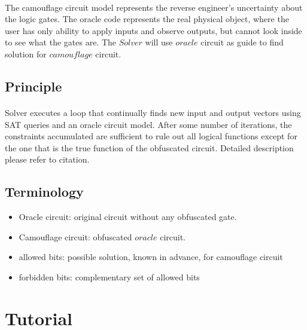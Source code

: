 \documentclass{article}
\begin{document}
	\paragraph{} The camouflage circuit model represents the reverse engineer's uncertainty about the logic gates. The oracle code represents the real physical object, where the user has only ability to apply inputs and observe outputs, but cannot look inside to see what the gates are. The $Solver$ will use $oracle$ circuit as guide to find solution for $camouflage$ circuit. 	
	\subsection{Principle} 
	\paragraph{}Solver executes a loop that continually finds new input and output vectors using SAT queries and an oracle circuit model. After some number of iterations, the constraints accumulated are sufficient to rule out all logical functions except for the one that is the true function of the obfuscated circuit. Detailed description please refer to citation. 
	\subsection{Terminology}
		\begin{itemize}
			\item Oracle circuit: original circuit without any obfuscated gate.
			\item Camouflage circuit: obfuscated $oracle$ circuit.
			\item allowed bits: possible solution, known in advance, for camouflage circuit
			\item forbidden bits: complementary set of allowed bits
		\end{itemize}

\section{Tutorial}
\end{document}
